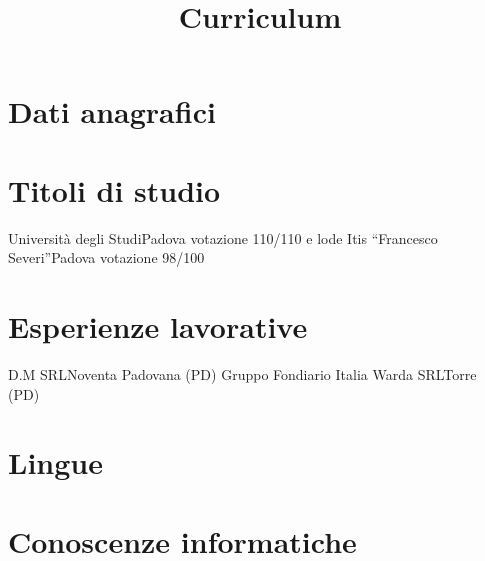 \documentclass[11pt,a4paper,sans]{moderncv}
\title{Curriculum}
\begin{document}
    \makecvtitle
    \section{Dati anagrafici}
    \section{Titoli di studio}
                {Università degli Studi}{Padova}%
                {votazione 110/110 e lode}{}
                {Itis ``Francesco Severi''}{Padova}%
                {votazione 98/100}{}
    \section{Esperienze lavorative}
                {D.M SRL}{Noventa Padovana (PD)}{}{}
                {Gruppo Fondiario Italia}{}{}{}
                {Warda SRL}{Torre (PD)}{}{}
    \section{Lingue}
    \section{Conoscenze informatiche}
\end{document}
